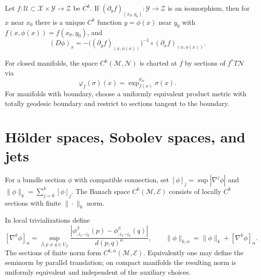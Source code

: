 \begin{theorem}
\label{thm:chow-iv-k4-banach-implicit-function}
Let $f:\mathcal U\subset\mathcal X\times\mathcal Y\to\mathcal Z$ be $C^k$.
If $(\partial_yf)_{(x_0,y_0)}:\mathcal Y\to\mathcal Z$ is an isomorphism,
then for $x$ near $x_0$ there is a unique $C^k$ function $y=\phi(x)$ near
$y_0$ with $f(x,\phi(x))=f(x_0,y_0)$, and
\[
(D\phi)_x=-\bigl((\partial_yf)_{(x,\phi(x))}\bigr)^{-1}
\circ(\partial_xf)_{(x,\phi(x))}.
\]
\end{theorem}

\begin{definition}
\label{def:chow-iv-k5-map-banach-manifold}
For closed manifolds, the space $C^k(\mathcal M,\mathcal N)$ is charted at
$f$ by sections of $f^*T\mathcal N$ via
\[
\varphi_f(\sigma)(x)=\exp^{g_{\mathcal N}}_{f(x)}\sigma(x).
\]
For manifolds with boundary, choose a uniformly equivalent product metric with
totally geodesic boundary and restrict to sections tangent to the boundary.
\end{definition}

\section{Hölder spaces, Sobolev spaces, and jets}

\begin{definition}
\label{def:chow-iv-k6-ck-sections}
For a bundle section $\phi$ with compatible connection, set
$[\phi]_j=\sup|\nabla^j\phi|$ and
$\|\phi\|_k=\sum_{j=0}^k[\phi]_j$.  The Banach space
$C^k(\mathcal M,\mathcal E)$ consists of locally $C^k$ sections with finite
$\|\cdot\|_k$ norm.
\end{definition}

\begin{definition}
\label{def:chow-iv-k7-holder-spaces}
In local trivializations define
\[
[\nabla^k\phi]_\alpha=
\sup_{\beta,p\ne q\in U_\beta}
\frac{|\phi^\beta_{;i_1\cdots i_k}(p)-\phi^\beta_{;i_1\cdots i_k}(q)|}{d(p,q)^\alpha},
\qquad
\|\phi\|_{k,\alpha}=\|\phi\|_k+[\nabla^k\phi]_\alpha.
\]
The sections of finite norm form $C^{k,\alpha}(\mathcal M,\mathcal E)$.
Equivalently one may define the seminorm by parallel translation; on compact
manifolds the resulting norm is uniformly equivalent and independent of the
auxiliary choices.
\end{definition}

